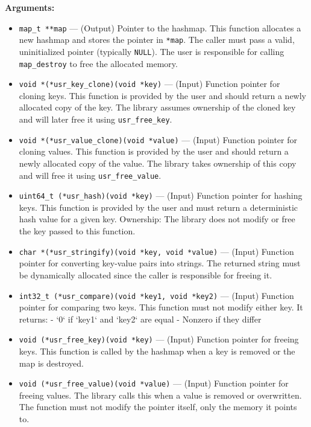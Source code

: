 \documentclass[titlepage]{article}
\begin{document}
\textbf{Arguments:}
\begin{itemize}
\item \texttt{map\_t **map} --- (Output) Pointer to the hashmap.
    This function allocates a new hashmap and stores the pointer in \texttt{*map}.
    The caller must pass a valid, uninitialized pointer (typically \texttt{NULL}).
    The user is responsible for calling \texttt{map\_destroy} to free the allocated memory.

\item \texttt{void *(*usr\_key\_clone)(void *key)} --- (Input) Function pointer for cloning keys.
    This function is provided by the user and should return a newly allocated copy of the key.
    The library assumes ownership of the cloned key and will later free it using \texttt{usr\_free\_key}.

\item \texttt{void *(*usr\_value\_clone)(void *value)} --- (Input) Function pointer for cloning values.
    This function is provided by the user and should return a newly allocated copy of the value.
    The library takes ownership of this copy and will free it using \texttt{usr\_free\_value}.

\item \texttt{uint64\_t (*usr\_hash)(void *key)} --- (Input) Function pointer for hashing keys.
    This function is provided by the user and must return a deterministic hash value for a given key.
    Ownership: The library does not modify or free the key passed to this function.

\item \texttt{char *(*usr\_stringify)(void *key, void *value)} --- (Input) Function pointer for converting key-value pairs into strings.
    The returned string must be dynamically allocated since the caller is responsible for freeing it.

\item \texttt{int32\_t (*usr\_compare)(void *key1, void *key2)} --- (Input) Function pointer for comparing two keys.
    This function must not modify either key. It returns:
    - `0` if `key1` and `key2` are equal
    - Nonzero if they differ

\item \texttt{void (*usr\_free\_key)(void *key)} --- (Input) Function pointer for freeing keys.
    This function is called by the hashmap when a key is removed or the map is destroyed.

\item \texttt{void (*usr\_free\_value)(void *value)} --- (Input) Function pointer for freeing values.
    The library calls this when a value is removed or overwritten. The function must not modify the pointer itself, only the memory it points to.
\end{itemize}
\newpage
\end{document}
